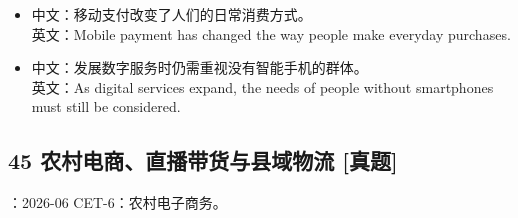 \documentclass[a4paper,11pt,UTF8,fontset=none]{ctexart}
\begin{document}
\par

\begin{itemize}[leftmargin=1.7em,itemsep=1pt,parsep=0pt,topsep=2pt]
\item \noindent 中文：移动支付改变了人们的日常消费方式。\\ 英文：Mobile payment has changed the way people make everyday purchases.\par


\item \noindent 中文：发展数字服务时仍需重视没有智能手机的群体。\\ 英文：As digital services expand, the needs of people without smartphones must still be considered.\par


\end{itemize}

\subsection{45 农村电商、直播带货与县域物流 {\color{AccentBlue} [真题]}}

\begin{tcolorbox}[enhanced,breakable,boxrule=0.35pt,colback=VeryPaleBlue,colframe=AccentBlue!40,left=7pt,right=7pt,top=4pt,bottom=4pt,borderline west={2pt}{0pt}{AccentBlue},before skip=4pt,after skip=6pt]
：2026-06 CET-6：农村电子商务。\par


\end{tcolorbox}
\end{document}

